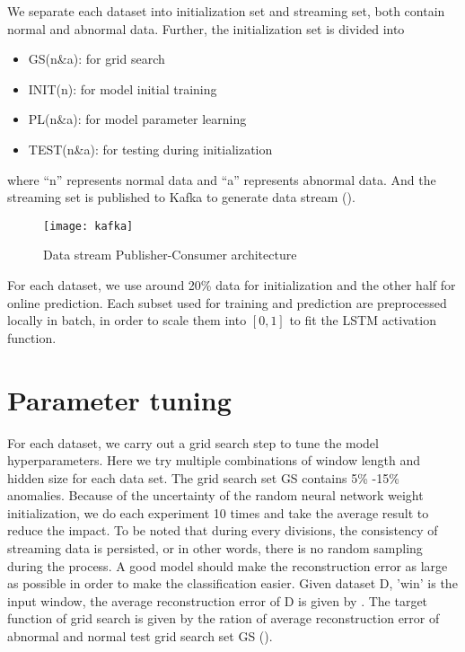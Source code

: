 We separate each dataset into initialization set and streaming set, both contain normal and abnormal data. Further, the initialization set is divided into 
\begin{itemize}
\item GS(n\&a): for grid search
\item INIT(n): for model initial training
\item PL(n\&a): for model parameter learning
\item TEST(n\&a): for testing during initialization
\end{itemize}
where “n” represents normal data and “a” represents abnormal data. And the streaming set is published to Kafka to generate data stream ().

\begin{figure}[h]
\centering
\texttt{[image: kafka]}
\caption[Data stream Publisher-Consumer architecture]{Data stream Publisher-Consumer architecture}
\label{fig:kafka}
\end{figure}

For each dataset, we use around 20\% data for initialization and the other half for online prediction. Each subset used for training and prediction are preprocessed locally in batch, in order to scale them into $[0,1]$ to fit the LSTM activation function.


\section{Parameter tuning}
\label{sec:parametertuning}

For each dataset, we carry out a grid search step to tune the model hyperparameters. Here we try multiple combinations of window length and hidden size for each data set. The grid search set GS contains 5\% -15\% anomalies. Because of the uncertainty of the random neural network weight initialization, we do each experiment 10 times and take the average result to reduce the impact. To be noted that during every divisions, the consistency of streaming data is persisted, or in other words, there is no random sampling during the process. A good model should make the reconstruction error as large as possible in order to make the classification easier. Given dataset D,  'win' is the input window, the average reconstruction error of D is given by . The target function of grid search is given by the ration of average reconstruction error of abnormal and normal test grid search set GS ().

